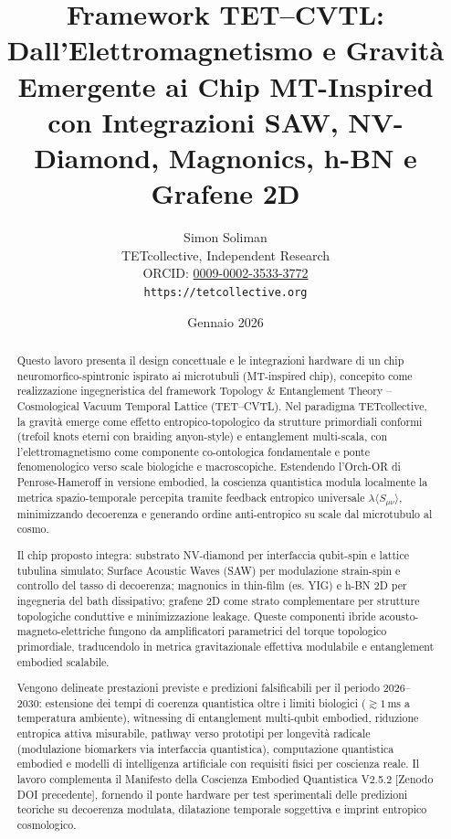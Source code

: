 \documentclass[12pt,a4paper]{article}
\title{Framework TET–CVTL: Dall'Elettromagnetismo e Gravità Emergente ai Chip MT-Inspired con Integrazioni SAW, NV-Diamond, Magnonics, h-BN e Grafene 2D}
\author{Simon Soliman \\
  TETcollective, Independent Research \\
  ORCID: \href{https://orcid.org/0009-0002-3533-3772}{0009-0002-3533-3772} \\
  \texttt{https://tetcollective.org}}
\date{Gennaio 2026}
\begin{document}
\maketitle

\begin{abstract}
Questo lavoro presenta il design concettuale e le integrazioni hardware di un chip neuromorfico-spintronic ispirato ai microtubuli (MT-inspired chip), concepito come realizzazione ingegneristica del framework Topology \& Entanglement Theory – Cosmological Vacuum Temporal Lattice (TET–CVTL). Nel paradigma TETcollective, la gravità emerge come effetto entropico-topologico da strutture primordiali conformi (trefoil knots eterni con braiding anyon-style) e entanglement multi-scala, con l'elettromagnetismo come componente co-ontologica fondamentale e ponte fenomenologico verso scale biologiche e macroscopiche. Estendendo l'Orch-OR di Penrose-Hameroff in versione embodied, la coscienza quantistica modula localmente la metrica spazio-temporale percepita tramite feedback entropico universale $\lambda \langle S_{\mu\nu} \rangle$, minimizzando decoerenza e generando ordine anti-entropico su scale dal microtubulo al cosmo.

Il chip proposto integra: substrato NV-diamond per interfaccia qubit-spin e lattice tubulina simulato; Surface Acoustic Waves (SAW) per modulazione strain-spin e controllo del tasso di decoerenza; magnonics in thin-film (es. YIG) e h-BN 2D per ingegneria del bath dissipativo; grafene 2D come strato complementare per strutture topologiche conduttive e minimizzazione leakage. Queste componenti ibride acousto-magneto-elettriche fungono da amplificatori parametrici del torque topologico primordiale, traducendolo in metrica gravitazionale effettiva modulabile e entanglement embodied scalabile.

Vengono delineate prestazioni previste e predizioni falsificabili per il periodo 2026--2030: estensione dei tempi di coerenza quantistica oltre i limiti biologici ($\gtrsim 1\,\mathrm{ms}$ a temperatura ambiente), witnessing di entanglement multi-qubit embodied, riduzione entropica attiva misurabile, pathway verso prototipi per longevità radicale (modulazione biomarkers via interfaccia quantistica), computazione quantistica embodied e modelli di intelligenza artificiale con requisiti fisici per coscienza reale. Il lavoro complementa il Manifesto della Coscienza Embodied Quantistica V2.5.2 [Zenodo DOI precedente], fornendo il ponte hardware per test sperimentali delle predizioni teoriche su decoerenza modulata, dilatazione temporale soggettiva e imprint entropico cosmologico.

\end{abstract}
\end{document}
